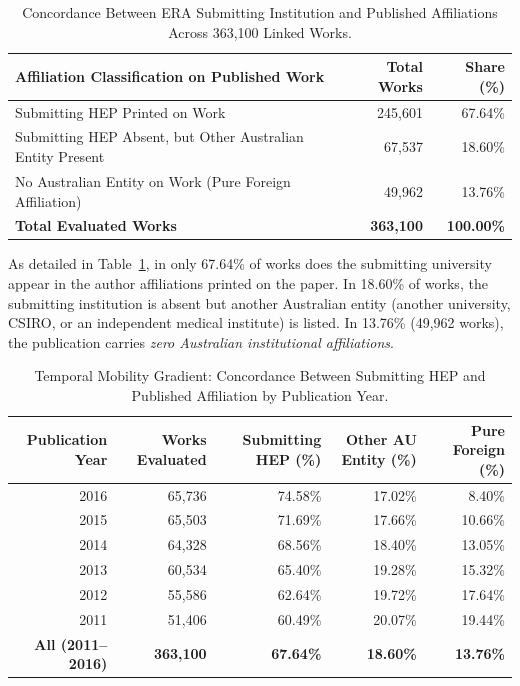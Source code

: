 \documentclass[11pt,a4paper]{article}
\begin{document}
\begin{table}[htbp]
\centering
\footnotesize
\caption{Concordance Between ERA Submitting Institution and Published Affiliations Across 363,100 Linked Works.}
\label{tab:affiliation_concordance}
\begin{tabularx}{\textwidth}{Xrr}
\toprule
\textbf{Affiliation Classification on Published Work} & \textbf{Total Works} & \textbf{Share (\%)} \\
\midrule
Submitting HEP Printed on Work                      & 245,601 & 67.64\% \\
Submitting HEP Absent, but Other Australian Entity Present &  67,537 & 18.60\% \\
No Australian Entity on Work (Pure Foreign Affiliation) &  49,962 & 13.76\% \\
\midrule
\textbf{Total Evaluated Works}                      & \textbf{363,100} & \textbf{100.00\%} \\
\bottomrule
\end{tabularx}
\end{table}

As detailed in Table~\ref{tab:affiliation_concordance}, in only 67.64\% of works does the submitting university appear in the author affiliations printed on the paper. In 18.60\% of works, the submitting institution is absent but another Australian entity (another university, CSIRO, or an independent medical institute) is listed. In 13.76\% (49,962 works), the publication carries \textit{zero Australian institutional affiliations}.

\begin{table}[htbp]
\centering
\footnotesize
\caption{Temporal Mobility Gradient: Concordance Between Submitting HEP and Published Affiliation by Publication Year.}
\label{tab:temporal_gradient}
\begin{tabularx}{\textwidth}{rrrrr}
\toprule
\textbf{Publication Year} & \textbf{Works Evaluated} & \textbf{Submitting HEP (\%)} & \textbf{Other AU Entity (\%)} & \textbf{Pure Foreign (\%)} \\
\midrule
2016 & 65,736 & 74.58\% & 17.02\% &  8.40\% \\
2015 & 65,503 & 71.69\% & 17.66\% & 10.66\% \\
2014 & 64,328 & 68.56\% & 18.40\% & 13.05\% \\
2013 & 60,534 & 65.40\% & 19.28\% & 15.32\% \\
2012 & 55,586 & 62.64\% & 19.72\% & 17.64\% \\
2011 & 51,406 & 60.49\% & 20.07\% & 19.44\% \\
\midrule
\textbf{All (2011--2016)} & \textbf{363,100} & \textbf{67.64\%} & \textbf{18.60\%} & \textbf{13.76\%} \\
\bottomrule
\end{tabularx}
\end{table}
\end{document}
